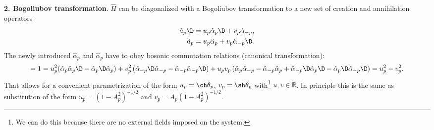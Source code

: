 
\textbf{2. Bogoliubov transformation}. 
$\hat{H}$ can be diagonalized with a Bogoliubov transformation to a new set of creation and annihilation operators
\begin{equation}
	\left.\begin{aligned}
    	\hat{a}_p\D &= u_p \hat{\alpha}_p\D + v_p \hat{\alpha}_{-p}, \\
		\hat{a}_p &= u_p \hat{\alpha}_p + v_p \hat{\alpha}_{-p}\D.
	\end{aligned}\right.
	\label{Btransform}
\end{equation}
The newly introduced $\hat{\alpha}_p$  and $\hat{\alpha}_p$ have to obey bosonic commutation relations (canonical transformation):
\begin{equation*}
	[\hat{a}_p, \hat{a}_p\D] = 1 = u_p^2 (\hat{\alpha}_p \hat{\alpha}_p\D-\hat{\alpha}_p\D \hat{\alpha}_p) + v_p^2 \left(\hat{\alpha}_{-p}\D \hat{\alpha}_{-p}-\hat{\alpha}_{-p} \hat{\alpha}_{-p}\D\right) + u_p v_p \left(
		\hat{\alpha}_p \hat{\alpha}_{-p} - \hat{\alpha}_{-p} \hat{\alpha}_p + \hat{\alpha}_{-p}\D \hat{\alpha}_{p}\D - \hat{\alpha}_{p}\D \hat{\alpha}_{-p}\D
	\right) = u_p^2 - v_p^2.
\end{equation*}
That allows for a convenient parametrization of the form $u_p = \ch \theta_p$, $v_p = \sh \theta_p$ with\footnote{
	We can do this because there are no external fields imposed on the system.
} $u,v \in \mathbb{R}$. In principle this is the same as substitution of the form $u_p = (1-A_p^2)^{-1/2}$ and $v_p = A_p (1-A_p^2)^{-1/2}$.


